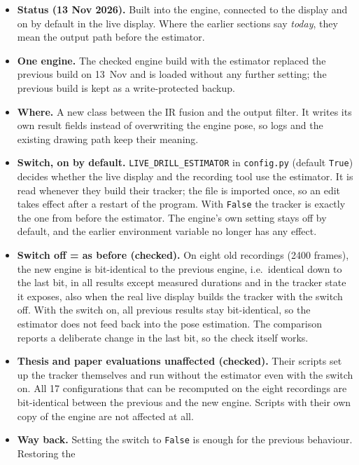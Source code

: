\documentclass[11pt,a4paper,fleqn]{article}
\begin{document}
\begin{itemize}
  \item \textbf{Status (13 Nov 2026).} Built into the engine, connected to the display and on by default in the live
        display. Where the earlier sections say \emph{today}, they mean the output path before the estimator.
  \item \textbf{One engine.} The checked engine build with the estimator replaced the previous build on 13~Nov and is
        loaded without any further setting; the previous build is kept as a write-protected backup.
  \item \textbf{Where.} A new class between the IR fusion and the output filter. It writes its own result fields
        instead of overwriting the engine pose, so logs and the existing drawing path keep their meaning.
  \item \textbf{Switch, on by default.} \texttt{LIVE\_DRILL\_ESTIMATOR} in \texttt{config.py} (default
        \texttt{True}) decides whether the live display and the recording tool use the estimator. It is read whenever
        they build their tracker; the file is imported once, so an edit takes effect after a restart of the program.
        With
        \texttt{False} the tracker is exactly the one from before the estimator. The engine's own setting stays off
        by default, and the earlier environment variable no longer has any effect.
  \item \textbf{Switch off = as before (checked).} On eight old recordings (2400 frames), the new engine is
        bit-identical to the previous engine, i.e.\ identical down to the last bit, in all results except measured
        durations and in the tracker state it exposes, also when the real live display builds the tracker with the switch off.
        With the switch on, all previous results stay bit-identical, so the estimator does not feed back into the pose
        estimation. The comparison reports a deliberate change in the last bit, so the check itself works.
  \item \textbf{Thesis and paper evaluations unaffected (checked).} Their scripts set up the tracker themselves and
        run without the estimator even with the switch on. All 17 configurations that can be recomputed on the eight
        recordings are bit-identical between the previous and the new engine. Scripts with their own copy of the
        engine are not affected at all.
  \item \textbf{Way back.} Setting the switch to \texttt{False} is enough for the previous behaviour. Restoring the

\end{itemize}
\end{document}
